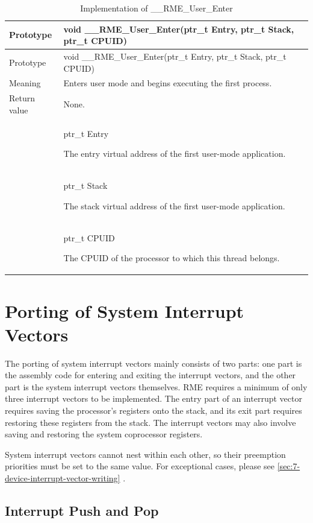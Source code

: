\begin{xltabular}{\textwidth}{@{}>{\hsize\raggedright\arraybackslash}X>{\hsize\raggedright\arraybackslash}X@{}}
\caption{Implementation of \_\_RME\_User\_Enter}\label{tab:7-18-rme-user-enter-implementation}\\
\toprule
Prototype & void \_\_RME\_User\_Enter(ptr\_t Entry, ptr\_t Stack, ptr\_t
CPUID)\tabularnewline
\endfirsthead
\toprule
Prototype & void \_\_RME\_User\_Enter(ptr\_t Entry, ptr\_t Stack, ptr\_t
CPUID)\tabularnewline
\midrule
\endhead
\bottomrule
\endlastfoot
Meaning & Enters user mode and begins executing the first process.\tabularnewline
Return value & None.\tabularnewline
{} & ptr\_t Entry

The entry virtual address of the first user-mode application.\strut
\tabularnewline
\strut
 & ptr\_t Stack

The stack virtual address of the first user-mode application.\strut
\tabularnewline
\strut
 & ptr\_t CPUID

The CPUID of the processor to which this thread belongs.\strut
\tabularnewline
\end{xltabular}
\nopagebreak[4]

\section{Porting of System Interrupt Vectors}\label{sec:7-system-interrupt-vector-porting}

The porting of system interrupt vectors mainly consists of two parts: one part is the assembly code for entering and exiting the interrupt vectors, and the other part is the system interrupt vectors themselves. RME requires a minimum of only three interrupt vectors to be implemented. The entry part of an interrupt vector requires saving the processor's registers onto the stack, and its exit part requires restoring these registers from the stack. The interrupt vectors may also involve saving and restoring the system coprocessor registers.

System interrupt vectors cannot nest within each other, so their preemption priorities must be set to the same value. For exceptional cases, please see \ref{sec:7-device-interrupt-vector-writing}
.

\subsection{Interrupt Push and Pop}\label{subsec:7-interrupt-push-and-pop}

